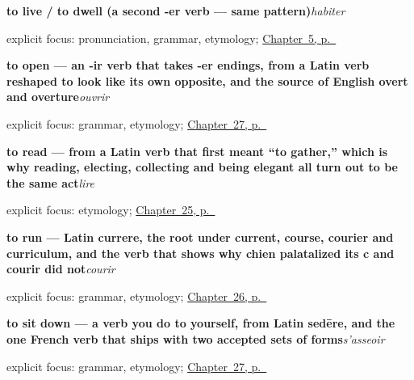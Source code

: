 \noindent\begin{minipage}[t]{\linewidth}
\raggedright
\textbf{to live / to dwell (a second -er verb — same pattern)}\enspace\emph{habiter}\par
\footnotesize explicit focus: pronunciation, grammar, etymology; \hyperref[ch:first-verbs]{Chapter~5, p.~\pageref*{ch:first-verbs}}
\end{minipage}\par\smallskip

\noindent\begin{minipage}[t]{\linewidth}
\raggedright
\textbf{to open — an -ir verb that takes -er endings, from a Latin verb reshaped to look like its own opposite, and the source of English overt and overture}\enspace\emph{ouvrir}\par
\footnotesize explicit focus: grammar, etymology; \hyperref[ch:fr-sitting-standing-opening-closing]{Chapter~27, p.~\pageref*{ch:fr-sitting-standing-opening-closing}}
\end{minipage}\par\smallskip

\noindent\begin{minipage}[t]{\linewidth}
\raggedright
\textbf{to read — from a Latin verb that first meant \textquotedblleft{}to gather,\textquotedblright{} which is why reading, electing, collecting and being elegant all turn out to be the same act}\enspace\emph{lire}\par
\footnotesize explicit focus: etymology; \hyperref[ch:fr-verbs-of-the-mind]{Chapter~25, p.~\pageref*{ch:fr-verbs-of-the-mind}}
\end{minipage}\par\smallskip

\noindent\begin{minipage}[t]{\linewidth}
\raggedright
\textbf{to run — Latin currere, the root under current, course, courier and curriculum, and the verb that shows why chien palatalized its c and courir did not}\enspace\emph{courir}\par
\footnotesize explicit focus: grammar, etymology; \hyperref[ch:fr-hearing-sleeping-walking-running]{Chapter~26, p.~\pageref*{ch:fr-hearing-sleeping-walking-running}}
\end{minipage}\par\smallskip

\noindent\begin{minipage}[t]{\linewidth}
\raggedright
\textbf{to sit down — a verb you do to yourself, from Latin sedēre, and the one French verb that ships with two accepted sets of forms}\enspace\emph{s'asseoir}\par
\footnotesize explicit focus: grammar, etymology; \hyperref[ch:fr-sitting-standing-opening-closing]{Chapter~27, p.~\pageref*{ch:fr-sitting-standing-opening-closing}}
\end{minipage}\par\smallskip

